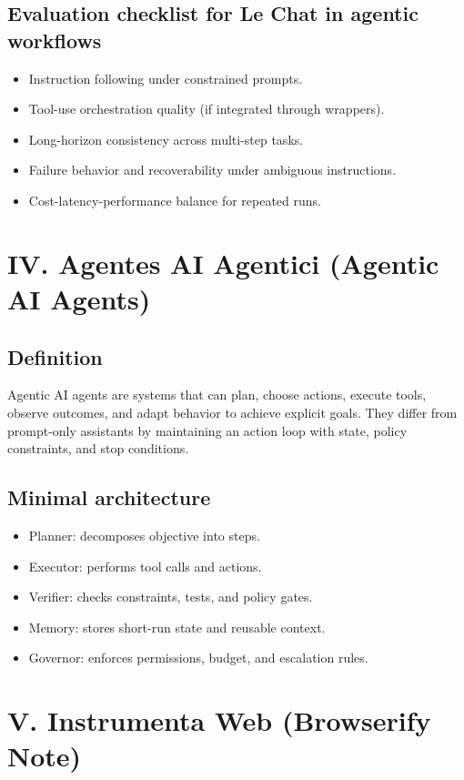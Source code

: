 \documentclass[10pt]{article}
\begin{document}
\subsection*{Evaluation checklist for Le Chat in agentic workflows}
\begin{itemize}
  \item Instruction following under constrained prompts.
  \item Tool-use orchestration quality (if integrated through wrappers).
  \item Long-horizon consistency across multi-step tasks.
  \item Failure behavior and recoverability under ambiguous instructions.
  \item Cost-latency-performance balance for repeated runs.
\end{itemize}

\section*{IV. Agentes AI Agentici (Agentic AI Agents)}

\subsection*{Definition}
Agentic AI agents are systems that can plan, choose actions, execute tools, observe outcomes, and adapt behavior to achieve explicit goals.
They differ from prompt-only assistants by maintaining an action loop with state, policy constraints, and stop conditions.

\subsection*{Minimal architecture}
\begin{itemize}
  \item Planner: decomposes objective into steps.
  \item Executor: performs tool calls and actions.
  \item Verifier: checks constraints, tests, and policy gates.
  \item Memory: stores short-run state and reusable context.
  \item Governor: enforces permissions, budget, and escalation rules.
\end{itemize}

\section*{V. Instrumenta Web (Browserify Note)}
\end{document}
